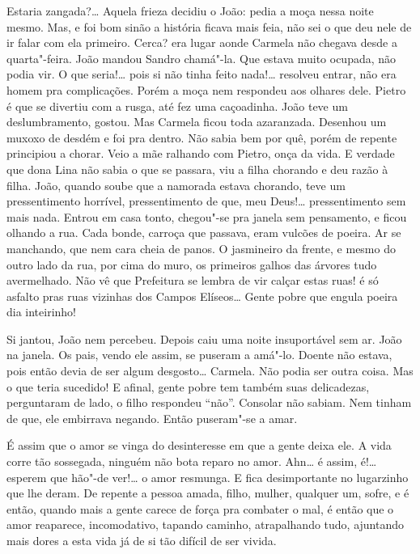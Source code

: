 \begin{linenumbers}
Estaria zangada?\ldots{} Aquela frieza decidiu o João: pedia a moça nessa
noite mesmo. Mas, e foi bom sinão a história ficava mais feia, não sei o
que deu nele de ir falar com ela primeiro. Cerca? era lugar aonde
Carmela não chegava desde a quarta"-feira. João mandou Sandro chamá"-la.
Que estava muito ocupada, não podia vir. O que seria!\ldots{} pois si não
tinha feito nada!\ldots{} resolveu entrar, não era homem pra complicações.
Porém a moça nem respondeu aos olhares dele. Pietro é que se divertiu
com a rusga, até fez uma caçoadinha. João teve um deslumbramento,
gostou. Mas Carmela ficou toda azaranzada. Desenhou um muxoxo de desdém
e foi pra dentro. Não sabia bem por quê, porém de repente principiou a
chorar. Veio a mãe ralhando com Pietro, onça da vida. E verdade que dona
Lina não sabia o que se passara, viu a filha chorando e deu razão à
filha. João, quando soube que a namorada estava chorando, teve um
pressentimento horrível, pressentimento de que, meu Deus!\ldots{}
pressentimento sem mais nada. Entrou em casa tonto, chegou"-se pra janela
sem pensamento, e ficou olhando a rua. Cada bonde, carroça que passava,
eram vulcões de poeira. Ar se manchando, que nem cara cheia de panos. O
jasmineiro da frente, e mesmo do outro lado da rua, por cima do muro, os
primeiros galhos das árvores tudo avermelhado. Não vê que Prefeitura se
lembra de vir calçar estas ruas! é só asfalto pras ruas vizinhas dos
Campos Elíseos\ldots{} Gente pobre que engula poeira dia inteirinho!

Si jantou, João nem percebeu. Depois caiu uma noite insuportável sem ar.
João na janela. Os pais, vendo ele assim, se puseram a amá"-lo. Doente
não estava, pois então devia de ser algum desgosto\ldots{} Carmela. Não podia
ser outra coisa. Mas o que teria sucedido! E afinal, gente pobre tem
também suas delicadezas, perguntaram de lado, o filho respondeu ``não''.
Consolar não sabiam. Nem tinham de que, ele embirrava negando. Então
puseram"-se a amar.

É assim que o amor se vinga do desinteresse em que a gente deixa ele. A
vida corre tão sossegada, ninguém não bota reparo no amor. Ahn\ldots{} é
assim, é!\ldots{} esperem que hão"-de ver!\ldots{} o amor resmunga. E fica
desimportante no lugarzinho que lhe deram. De repente a pessoa amada,
filho, mulher, qualquer um, sofre, e é então, quando mais a gente carece
de força pra combater o mal, é então que o amor reaparece, incomodativo,
tapando caminho, atrapalhando tudo, ajuntando mais dores a esta vida já
de si tão difícil de ser vivida.


\end{linenumbers}
